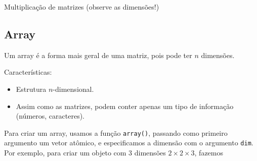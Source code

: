 \documentclass[10pt,a4paper]{book}
\newenvironment{Shaded}{\begin{snugshade}}{\end{snugshade}}
\newcommand{\KeywordTok}[1]{\textcolor[rgb]{0.13,0.29,0.53}{\textbf{#1}}}
\newcommand{\DataTypeTok}[1]{\textcolor[rgb]{0.13,0.29,0.53}{#1}}
\newcommand{\DecValTok}[1]{\textcolor[rgb]{0.00,0.00,0.81}{#1}}
\newcommand{\StringTok}[1]{\textcolor[rgb]{0.31,0.60,0.02}{#1}}
\newcommand{\OperatorTok}[1]{\textcolor[rgb]{0.81,0.36,0.00}{\textbf{#1}}}
\newcommand{\NormalTok}[1]{#1}
\providecommand{\tightlist}{%
  \setlength{\itemsep}{0pt}\setlength{\parskip}{0pt}}
\begin{document}
Multiplicação de matrizes (observe as dimensões!)

\begin{Shaded}
\end{Shaded}

\subsection{Array}\label{array}

Um array é a forma mais geral de uma matriz, pois pode ter \(n\)
dimensões.

Características:

\begin{itemize}
\tightlist
\item
  Estrutura \(n\)-dimensional.
\item
  Assim como as matrizes, podem conter apenas um tipo de informação
  (números, caracteres).
\end{itemize}

Para criar um array, usamos a função \texttt{array()}, passando como
primeiro argumento um vetor atômico, e especificamos a dimensão com o
argumento \texttt{dim}. Por exemplo, para criar um objeto com 3
dimensões \(2 \times 2 \times 3\), fazemos
\end{document}
